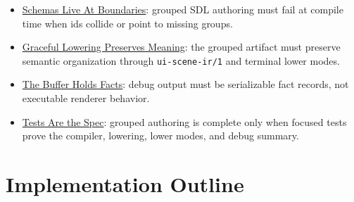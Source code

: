 \begin{itemize}
\tightlist
\item
  \href{https://github.com/flyingrobots/bijou/blob/cbd70612140e7a450d764b3c7be1c6af878b99bc/docs/invariants/schemas-live-at-boundaries.md}{Schemas Live At Boundaries}: grouped SDL authoring must fail at compile time when ids collide or point to missing groups.
\item
  \href{https://github.com/flyingrobots/bijou/blob/cbd70612140e7a450d764b3c7be1c6af878b99bc/docs/invariants/graceful-lowering-preserves-meaning.md}{Graceful Lowering Preserves Meaning}: the grouped artifact must preserve semantic organization through \texttt{u\allowbreak{}i\allowbreak{}-\allowbreak{}s\allowbreak{}c\allowbreak{}e\allowbreak{}n\allowbreak{}e\allowbreak{}-\allowbreak{}i\allowbreak{}r\allowbreak{}/\allowbreak{}1} and terminal lower modes.
\item
  \href{https://github.com/flyingrobots/bijou/blob/cbd70612140e7a450d764b3c7be1c6af878b99bc/docs/invariants/buffer-holds-facts.md}{The Buffer Holds Facts}: debug output must be serializable fact records, not executable renderer behavior.
\item
  \href{https://github.com/flyingrobots/bijou/blob/cbd70612140e7a450d764b3c7be1c6af878b99bc/docs/invariants/tests-are-the-spec.md}{Tests Are the Spec}: grouped authoring is complete only when focused tests prove the compiler, lowering, lower modes, and debug summary.
\end{itemize}

\section{Implementation Outline}\label{record-141-implementation-outline}

